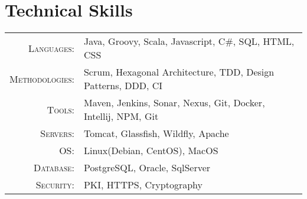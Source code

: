 \documentclass[a4paper,11pt]{article}
\begin{document}
    \section{Technical Skills}
    \begin{tabular}{rl}
        \textsc{Languages:}& Java, Groovy, Scala, Javascript, C\#, SQL, HTML, CSS\\
        \textsc{Methodologies:}& Scrum, Hexagonal Architecture, TDD, Design Patterns, DDD, CI\\
        \textsc{Tools:}& Maven, Jenkins, Sonar, Nexus, Git, Docker, Intellij, NPM, Git\\
        \textsc{Servers:}& Tomcat, Glassfish, Wildfly, Apache\\
        \textsc{OS:}& Linux(Debian, CentOS), MacOS\\
        \textsc{Database:}& PostgreSQL, Oracle, SqlServer\\
        \textsc{Security:}& PKI, HTTPS, Cryptography\\
    \end{tabular}
\end{document}
